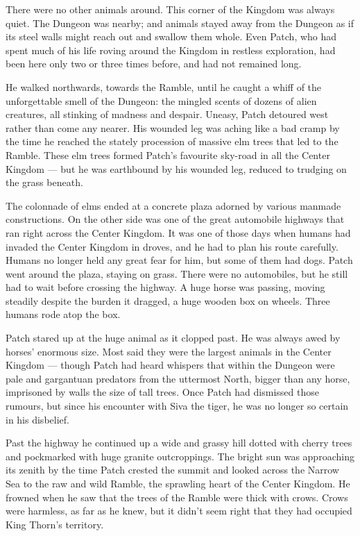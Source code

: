 \documentclass[12pt]{memoir}
\begin{document}
There were no other animals around. This corner of the Kingdom was
always quiet. The Dungeon was nearby; and animals stayed away from the
Dungeon as if its steel walls might reach out and swallow them
whole. Even Patch, who had spent much of his life roving around the
Kingdom in restless exploration, had been here only two or three times
before, and had not remained long.

He walked northwards, towards the Ramble, until he caught a whiff of
the unforgettable smell of the Dungeon: the mingled scents of dozens
of alien creatures, all stinking of madness and despair. Uneasy, Patch
detoured west rather than come any nearer. His wounded leg was aching
like a bad cramp by the time he reached the stately procession of
massive elm trees that led to the Ramble. These elm trees formed
Patch’s favourite sky-road in all the Center Kingdom — but he was
earthbound by his wounded leg, reduced to trudging on the grass
beneath.

The colonnade of elms ended at a concrete plaza adorned by various
manmade constructions. On the other side was one of the great
automobile highways that ran right across the Center Kingdom. It was
one of those days when humans had invaded the Center Kingdom in
droves, and he had to plan his route carefully. Humans no longer held
any great fear for him, but some of them had dogs. Patch went around
the plaza, staying on grass. There were no automobiles, but he still
had to wait before crossing the highway. A huge horse was passing,
moving steadily despite the burden it dragged, a huge wooden box on
wheels. Three humans rode atop the box.

Patch stared up at the huge animal as it clopped past. He was always
awed by horses’ enormous size. Most said they were the largest animals
in the Center Kingdom — though Patch had heard whispers that within
the Dungeon were pale and gargantuan predators from the uttermost
North, bigger than any horse, imprisoned by walls the size of tall
trees. Once Patch had dismissed those rumours, but since his encounter
with Siva the tiger, he was no longer so certain in his disbelief.

Past the highway he continued up a wide and grassy hill dotted with
cherry trees and pockmarked with huge granite outcroppings. The bright
sun was approaching its zenith by the time Patch crested the summit
and looked across the Narrow Sea to the raw and wild Ramble, the
sprawling heart of the Center Kingdom. He frowned when he saw that the
trees of the Ramble were thick with crows. Crows were harmless, as far
as he knew, but it didn’t seem right that they had occupied King
Thorn’s territory.
\end{document}
